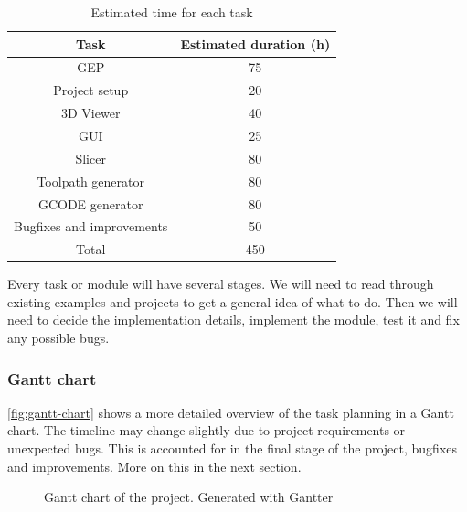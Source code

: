\begin{table}[h!]
\centering
\begin{tabular}{ |c|c| } 
    \hline
    Task & Estimated duration (h)  \\ 
    \hline
    
    \hline
    GEP & 75  \\ 
    \hline
    Project setup & 20  \\ 
    \hline
    3D Viewer & 40  \\ 
    \hline
    GUI & 25  \\ 
    \hline
    Slicer & 80  \\ 
    \hline
    Toolpath generator & 80  \\ 
    \hline
    GCODE generator & 80  \\ 
    \hline
    Bugfixes and improvements & 50 \\
    
    \hline
    Total & 450 \\
    \hline
\end{tabular}
\caption{Estimated time for each task}\label{table:task-time}
\end{table}



Every task or module will have several stages. We will need to read through existing examples and projects to get a general idea of what to do. Then we will need to decide the implementation details, implement the module, test it and fix any possible bugs.

\subsubsection{Gantt chart}

\autoref{fig:gantt-chart} shows a more detailed overview of the task planning in a Gantt chart. The timeline may change slightly due to project requirements or unexpected bugs. This is accounted for in the final stage of the project, bugfixes and improvements. More on this in the next section.


\begin{figure}[H]
    \noindent{}
    \caption{Gantt chart of the project. Generated with Gantter \cite{gantter}}
    \label{fig:gantt-chart}
\end{figure}


